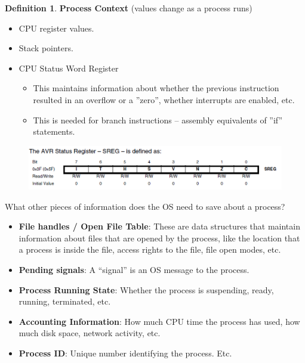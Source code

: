 \documentclass[11pt,a4paper]{article}
\theoremstyle{definition}
\newtheorem{definition}{Definition}[section]
\newenvironment{myitemize}
{ \begin{itemize}
    \setlength{\itemsep}{5pt}
    \setlength{\parskip}{0pt}
    \setlength{\parsep}{0pt}     }
{ \end{itemize}                  }
\begin{document}
\begin{definition}{\textbf{Process Context}} (values change as a process runs)
	\begin{myitemize}
		\item CPU register values. 
		\item Stack pointers.
		\item CPU Status Word Register
		\begin{myitemize}
			\item This maintains information about whether the previous instruction resulted in an overflow or a ''zero'', whether interrupts are enabled, etc.
			\item This is needed for branch instructions – assembly equivalents of ''if'' statements.
		\end{myitemize}
	\end{myitemize}
\end{definition}

\begin{figure}[h!]
	\includegraphics[scale=0.6]{m1/statusRegister}
	\centering
\end{figure}

\begin{tcolorbox}
	\textsf{What other pieces of information does the OS need to save about a process?}
	
	\begin{myitemize}
		\item \textbf{File handles / Open File Table}: These are data structures that maintain information about files that are opened by the process, like the location that a process is inside the file, access rights to the file, file open modes, etc.
		\item \textbf{Pending signals}: A “signal” is an OS message to the process.
		\item \textbf{Process Running State}: Whether the process is suspending, ready, running, terminated, etc.
		\item \textbf{Accounting Information}: How much CPU time the process has used, how much disk space, network activity, etc.
		\item \textbf{Process ID}: Unique number identifying the process. Etc.
	\end{myitemize}
\end{tcolorbox}
\end{document}

